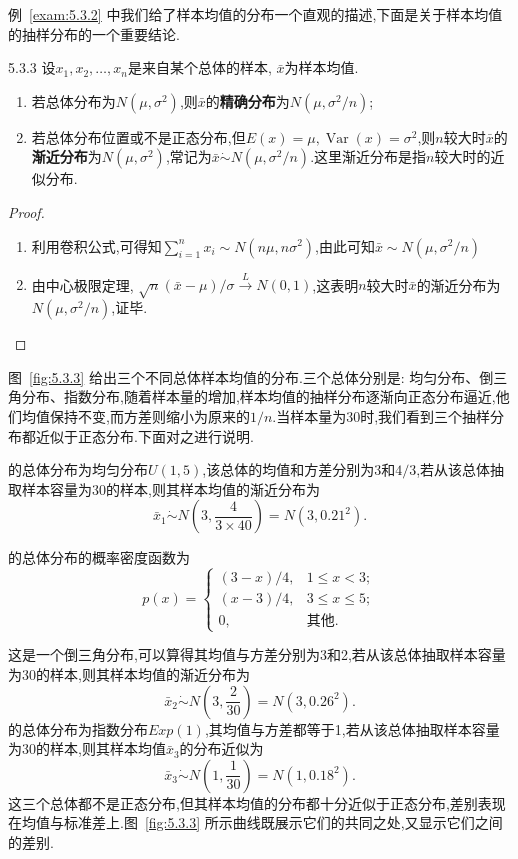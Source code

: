 例~\ref{exam:5.3.2} 中我们给了样本均值的分布一个直观的描述,下面是关于样本均值的抽样分布的一个重要结论.
\begin{theorem}{}{5.3.3}
设$x_1,x_2,\dotsc,x_n$是来自某个总体的样本, $\bar x$为样本均值.
\begin{enumerate}
\item 若总体分布为$N(\mu,\sigma^2)$,则$\bar x$的\textbf{精确分布}为$N(\mu,\sigma^2/n)$;
\item 若总体分布位置或不是正态分布,但$E(x)=\mu,\operatorname{Var}(x)=\sigma^2$,则$n$较大时$\bar x$的\textbf{渐近分布}为$N(\mu,\sigma^2)$,常记为$\bar x\dot{\sim}N(\mu,\sigma^2/n)$.这里渐近分布是指$n$较大时的近似分布.
\end{enumerate}
\end{theorem}
\begin{proof}
\begin{enumerate}
\item 利用卷积公式,可得知$\sum_{i=1}^nx_i\sim N(n\mu,n\sigma^2)$,由此可知$\bar x\sim N(\mu,\sigma^2/n)$
\item 由中心极限定理, $\sqrt n(\bar x-\mu)/\sigma\xrightarrow{L}N(0,1)$,这表明$n$较大时$\bar x$的渐近分布为$N(\mu,\sigma^2/n)$,证毕.
\end{enumerate}
\end{proof}
\begin{example}\label{exam:5.3.3}
图~\ref{fig:5.3.3} 给出三个不同总体样本均值的分布.三个总体分别是:
均匀分布、倒三角分布、指数分布,随着样本量的增加,样本均值的抽样分布逐渐向正态分布逼近,他们均值保持不变,而方差则缩小为原来的$1/n$.当样本量为30时,我们看到三个抽样分布都近似于正态分布.下面对之进行说明.

的总体分布为均匀分布$U(1,5)$,该总体的均值和方差分别为$3$和$4/3$,若从该总体抽取样本容量为30的样本,则其样本均值的渐近分布为
\[\bar x_1\dot{\sim}N\left(3,\frac4{3\times40}\right)=N(3,0.21^2).\]

的总体分布的概率密度函数为
\[p(x)=\begin{cases}
(3-x)/4,&1\leq x<3;\\
(x-3)/4,&3\leq x\leq 5;\\
0,&\text{其他}.
\end{cases}\]

这是一个倒三角分布,可以算得其均值与方差分别为3和2,若从该总体抽取样本容量为30的样本,则其样本均值的渐近分布为
\[\bar x_2\dot{\sim} N\left(3,\frac{2}{30}\right)=N(3,0.26^2).\]
的总体分布为指数分布$Exp(1)$,其均值与方差都等于1,若从该总体抽取样本容量为30的样本,则其样本均值$\bar x_3$的分布近似为
\[\bar x_3\dot{\sim}N\left(1,\frac1{30}\right)=N(1,0.18^2).\]
这三个总体都不是正态分布,但其样本均值的分布都十分近似于正态分布,差别表现在均值与标准差上.图~\ref{fig:5.3.3} 所示曲线既展示它们的共同之处,又显示它们之间的差别.
\end{example}
